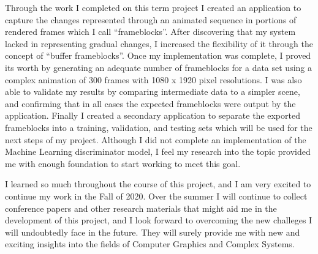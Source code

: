 \documentclass[conference]{IEEEtran}
\begin{document}
Through the work I completed on this term project
I created an application to capture the changes
represented through an animated sequence in portions of rendered frames which I call
``frameblocks''. After discovering that my system lacked in representing gradual
changes, I increased the flexibility of it through the concept of ``buffer
frameblocks''. Once my implementation was complete,
I proved its worth by generating an adequate number of frameblocks for a
data set using a complex animation of 300 frames with 1080 x 1920 pixel
resolutions.
I was also able to validate my results
by comparing intermediate data to a simpler scene, and confirming that in all cases
the expected frameblocks were output by the application.
Finally I created a secondary application to separate the exported frameblocks
into a training, validation, and testing sets which will be used for the next
steps of my project. Although I did not complete an implementation of the
Machine Learning discriminator model, I feel my research into the topic provided
me with enough foundation to start working to meet this goal.

I learned so much throughout the course of this project, and I am very excited
to continue my work in the Fall of 2020. Over the summer I will continue to
collect conference papers and other research materials that might aid me in the
development of this project, and I look forward to overcoming the new challeges I will
undoubtedly face in the future. They will surely provide me with new and
exciting insights
into the fields of Computer Graphics and Complex Systems.
\end{document}
